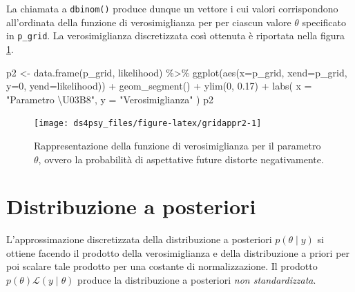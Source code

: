 \documentclass[
  11pt,
]{krantz}
\makeatletter
\newenvironment{Shaded}{\begin{snugshade}}{\end{snugshade}}
\newcommand{\AttributeTok}[1]{\textcolor[rgb]{0.61,0.61,0.61}{#1}}
\newcommand{\DecValTok}[1]{\textcolor[rgb]{0.06,0.06,0.06}{#1}}
\newcommand{\FloatTok}[1]{\textcolor[rgb]{0.06,0.06,0.06}{#1}}
\newcommand{\FunctionTok}[1]{\textcolor[rgb]{0,0,0}{#1}}
\newcommand{\NormalTok}[1]{#1}
\newcommand{\OtherTok}[1]{\textcolor[rgb]{0.37,0.37,0.37}{#1}}
\newcommand{\SpecialCharTok}[1]{\textcolor[rgb]{0,0,0}{#1}}
\newcommand{\StringTok}[1]{\textcolor[rgb]{0.5,0.5,0.5}{#1}}
\newenvironment{kframe}{%
\medskip{}
\setlength{\fboxsep}{.8em}
 \def\at@end@of@kframe{}%
 \ifinner\ifhmode%
  \def\at@end@of@kframe{\end{minipage}}%
  \begin{minipage}{\columnwidth}%
 \fi\fi%
 \def\FrameCommand##1{\hskip\@totalleftmargin \hskip-\fboxsep
 \colorbox{shadecolor}{##1}\hskip-\fboxsep
     \hskip-\linewidth \hskip-\@totalleftmargin \hskip\columnwidth}%
 \MakeFramed {\advance\hsize-\width
   \@totalleftmargin\z@ \linewidth\hsize
   \@setminipage}}%
 {\par\unskip\endMakeFramed%
 \at@end@of@kframe}
\renewenvironment{Shaded}{\begin{kframe}}{\end{kframe}}
\theoremstyle{definition}
\theoremstyle{definition}
\theoremstyle{definition}
\theoremstyle{definition}
\theoremstyle{remark}
\makeatother
\begin{document}
La chiamata a \texttt{dbinom()} produce dunque un vettore i cui valori corrispondono all'ordinata della funzione di verosimiglianza per per ciascun valore \(\theta\) specificato in \texttt{p\_grid}. La verosimiglianza discretizzata così ottenuta è riportata nella figura \ref{fig:gridappr2}.

\begin{Shaded}
\begin{Highlighting}[]
\NormalTok{p2 }\OtherTok{\textless{}{-}} \FunctionTok{data.frame}\NormalTok{(p\_grid, likelihood) }\SpecialCharTok{\%\textgreater{}\%}
  \FunctionTok{ggplot}\NormalTok{(}\FunctionTok{aes}\NormalTok{(}\AttributeTok{x=}\NormalTok{p\_grid, }\AttributeTok{xend=}\NormalTok{p\_grid, }\AttributeTok{y=}\DecValTok{0}\NormalTok{, }\AttributeTok{yend=}\NormalTok{likelihood)) }\SpecialCharTok{+}
  \FunctionTok{geom\_segment}\NormalTok{() }\SpecialCharTok{+}
  \FunctionTok{ylim}\NormalTok{(}\DecValTok{0}\NormalTok{, }\FloatTok{0.17}\NormalTok{) }\SpecialCharTok{+}
  \FunctionTok{labs}\NormalTok{(}
    \AttributeTok{x =} \StringTok{"Parametro \textbackslash{}U03B8"}\NormalTok{,}
    \AttributeTok{y =} \StringTok{"Verosimiglianza"}
\NormalTok{  )}
\NormalTok{p2}
\end{Highlighting}
\end{Shaded}

\begin{figure}[h]

{\centering \texttt{[image: ds4psy\_files/figure-latex/gridappr2-1]} 

}

\caption{Rappresentazione della funzione di verosimiglianza per il parametro $\theta$, ovvero la probabilità di aspettative future distorte negativamente.}\label{fig:gridappr2}
\end{figure}

\hypertarget{distribuzione-a-posteriori-1}{%
\section{Distribuzione a posteriori}\label{distribuzione-a-posteriori-1}}

L'approssimazione discretizzata della distribuzione a posteriori \(p(\theta \mid y)\) si ottiene facendo il prodotto della verosimiglianza e della distribuzione a priori per poi scalare tale prodotto per una costante di normalizzazione. Il prodotto \(p(\theta)\mathcal{L}(y \mid \theta)\) produce la distribuzione a posteriori \emph{non standardizzata}.
\end{document}
